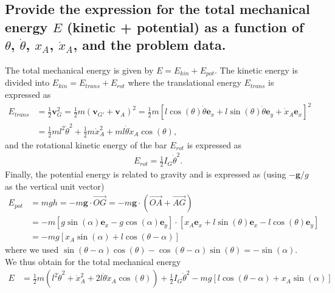 \documentclass[11pt,a4paper]{exam}
\newcommand{\exACDH}{\bm e_x}
\newcommand{\eyACDH}{\bm e_y}
\begin{document}
\begin{parts}
\part{Provide the expression for the total mechanical energy $E$ (kinetic + potential) as a function of $\theta$, $\dot\theta$, $x_A$, $\dot x_A$, and the problem data.}
    \par\vspace{2mm}
    The total mechanical energy is given by $E = E_{kin} + E_{pot}$.
    The kinetic energy is divided into $E_{kin} = E_{trans} + E_{rot}$ where the translational energy $E_{trans}$ is expressed as
    \begin{align}
        E_{trans} &= \frac{1}{2} \bm v_G^2 = \frac{1}{2} m (\bm v_{G'} + \bm v_{A})^2 = \frac{1}{2} m \left[l\cos(\theta)\dot\theta \exACDH + l\sin(\theta)\dot\theta \eyACDH + \dot x_A \exACDH\right]^2 \nonumber\\
        &=\frac{1}{2}ml^2\dot\theta^2 + \frac{1}{2}m\dot x_A^2 + ml\dot\theta \dot x_A \cos(\theta),
        \label{eq:Ecin}
    \end{align}
    and the rotational kinetic energy of the bar $E_{rot}$ is expressed as
    \begin{align}
        E_{rot} = \frac{1}{2} I_G \dot\theta^2.
        \label{eq:Erot}
    \end{align}
    Finally, the potential energy is related to gravity and is expressed as (using $-\bm g/g$ as the vertical unit vector)
    \begin{align}
        E_{pot} &= mgh = -m\bm g \cdot \overrightarrow{OG} =-m\bm g \cdot \left(\overrightarrow{OA}+\overrightarrow{AG}\right)\nonumber\\
        &= -m[g\sin(\alpha)\exACDH - g\cos(\alpha)\eyACDH] \cdot [x_A \exACDH +l\sin(\theta)\exACDH - l\cos(\theta)\eyACDH]\nonumber\\
        &= -mg [x_A\sin(\alpha) + l\cos(\theta-\alpha)]
        \label{eq:Epot}
    \end{align}
    where we used $\sin(\theta-\alpha)\cos(\theta) - \cos(\theta-\alpha)\sin(\theta) = -\sin(\alpha)$.
    We thus obtain for the total mechanical energy
    \begin{align}
        E
        &=\frac{1}{2}m\left(l^2\dot\theta^2 + \dot x_A^2 + 2l\dot\theta \dot x_A \cos(\theta)\right) + \frac{1}{2} I_G \dot\theta^2 -mg\left[l\cos(\theta-\alpha) + x_A\sin(\alpha)\right]
        \label{eq:Emec}
    \end{align}

\end{parts}
\end{document}
